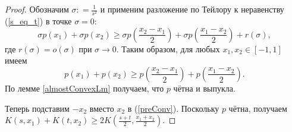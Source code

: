 \begin{proof}
Обозначим $\sigma: = {\frac 1 {s^2}}$ и применим разложение по Тейлору к неравенству (\ref{s_eq_t}) в точке $\sigma = 0$:
$$
\sigma p(x_1) + \sigma p(x_2) \ge \sigma p( {\frac { x_2 - x_1}2 } ) + \sigma p( {\frac { x_1 - x_2} 2 } ) + r(\sigma),
$$
где $r(\sigma) = o(\sigma)$ при $\sigma \to 0$.
Таким образом, для любых $x_1, x_2 \in [-1, 1]$ имеем
$$
p(x_1) + p(x_2) \ge p( { \frac {x_2 - x_1} 2 } ) + p( { \frac {x_1 - x_2} 2 } ).
$$
По лемме \ref{almostConvexLm} получаем, что $p$ чётна и выпукла.

Теперь подставим $-x_2$ вместо $x_2$ в (\ref{preConv}).
Поскольку $p$ чётна, получаем
$K(s, x_1) + K(t, x_2) \ge 2 K( { \frac {s + t}2 }, {\frac { x_1 + x_2}2 } )$.
\end{proof}

